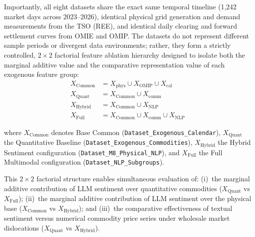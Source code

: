 Importantly, all eight datasets share the exact same temporal timeline (1,242 market days across 2023--2026), identical physical grid generation and demand measurements from the TSO (REE), and identical daily clearing and forward settlement curves from OMIE and OMIP. The datasets do not represent different sample periods or divergent data environments; rather, they form a strictly controlled, $2 \times 2$ factorial feature ablation hierarchy designed to isolate both the marginal additive value and the comparative representation value of each exogenous feature group:
\begin{align}
    X_{\text{Common}} &= X_{\text{phys}} \cup X_{\text{OMIP}} \cup X_{\text{cal}} \label{eq:feat_common} \\
    X_{\text{Quant}} &= X_{\text{Common}} \cup X_{\text{comm}} \label{eq:feat_quant} \\
    X_{\text{Hybrid}} &= X_{\text{Common}} \cup X_{\text{NLP}} \label{eq:feat_hybrid} \\
    X_{\text{Full}} &= X_{\text{Common}} \cup X_{\text{comm}} \cup X_{\text{NLP}} \label{eq:feat_full}
\end{align}
{\sloppy
where $X_{\text{Common}}$ denotes Base Common (\texttt{Dataset\_Exogenous\_Calendar}), $X_{\text{Quant}}$ the Quantitative Baseline (\texttt{Dataset\_Exogenous\_Commodities}), $X_{\text{Hybrid}}$ the Hybrid Sentiment configuration (\texttt{Dataset\_M8\_Physical\_NLP}), and $X_{\text{Full}}$ the Full Multimodal configuration (\texttt{Dataset\_NLP\_Subgroups}).
\par}

This $2 \times 2$ factorial structure enables simultaneous evaluation of: (i)~the marginal additive contribution of LLM sentiment over quantitative commodities ($X_{\text{Quant}}$ vs $X_{\text{Full}}$); (ii)~the marginal additive contribution of LLM sentiment over the physical base ($X_{\text{Common}}$ vs $X_{\text{Hybrid}}$); and (iii)~the comparative effectiveness of textual sentiment versus numerical commodity price series under wholesale market dislocations ($X_{\text{Quant}}$ vs $X_{\text{Hybrid}}$).

